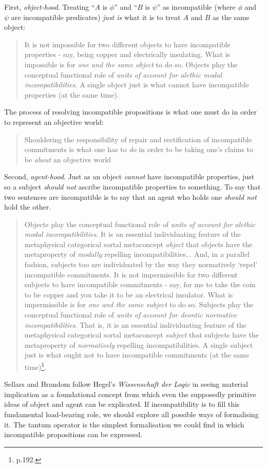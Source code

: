 First, \emph{object-hood}.
Treating ``$A$ is $\phi$'' and ``$B$ is $\psi$'' as incompatible (where $\phi$ and $\psi$ are incompatible predicates) \emph{just is} what it is to treat $A$ and $B$ as the same object:
\begin{quote}
It is not impossible for two different objects to have incompatible properties - say, being copper and electrically insulating. What is impossible is for \emph{one and the same object} to do so. 
Objects play the conceptual functional role of \emph{units of account for alethic modal incompatibilities}. 
A single object just is what cannot have incompatible properties (at the same time).
\end{quote}
The process of resolving incompatible propositions is what one must do in order to represent an objective world:
\begin{quote}
Shouldering the responsibility of repair and rectification of incompatible commitments is what one has to \emph{do} in order to be taking one's claims to be \emph{about} an objective world
\end{quote}
Second, \emph{agent-hood}.
Just as an object \emph{cannot} have incompatible properties, just so a subject \emph{should not} ascribe incompatible properties to something.
To say that two sentences are incompatible is to say that an agent who holds one \emph{should not} hold the other.
\begin{quote}
Objects play the conceptual functional role of \emph{units of account for alethic modal incompatibilities}. 
It is an essential individuating feature of the metaphysical categorical sortal metaconcept \emph{object} that objects have the metaproperty of \emph{modally} repelling incompatibilities...
And, in a parallel fashion, subjects too are individuated by the way they normatively `repel' incompatible commitments.
It is not impermissible for two different subjects to have incompatible commitments - say, for me to take the coin to be copper and you take it to be an electrical insulator. What is impermissible is for \emph{one and the same subject} to do so. Subjects play the conceptual functional role of \emph{units of account for deontic normative incompatibilities}. 
That is, it is an essential individuating feature of the metaphysical categorical sortal metaconcept \emph{subject} that subjects have the metaproperty of \emph{normatively} repelling incompatibilities. A single subject just is what ought not to have incompatible commitments (at the same time)\footnote{\cite{brandom} p.192.}.
\end{quote}
Sellars and Brandom follow Hegel's  \emph{Wissenschaft der Logic} \cite{HegelGWF:wisdlog} in seeing material implication as a foundational concept from which even the supposedly primitive ideas of object and agent can be explicated.
If incompatibility is to fill this fundamental load-bearing role, we should explore all possible ways of formalising it. 
The tantum operator is the simplest formalisation we could find in which incompatible propositions can be expressed.

